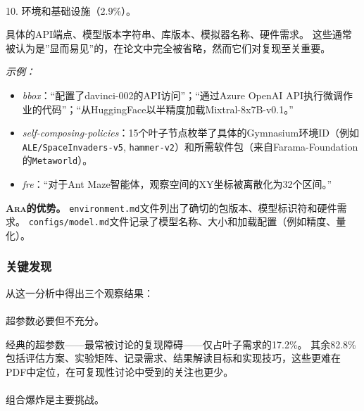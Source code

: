 \documentclass[
]{article}
\makeatletter
\let\oldparagraph\paragraph
\renewcommand{\paragraph}{
    \@ifstar
      \xxxParagraphStar
      \xxxParagraphNoStar
  }
\newcommand{\xxxParagraphStar}[1]{\oldparagraph*{#1}\mbox{}}
\newcommand{\xxxParagraphNoStar}[1]{\oldparagraph{#1}\mbox{}}
\newcommand{\passthrough}[1]{#1}
\providecommand{\tightlist}{%
  \setlength{\itemsep}{0pt}\setlength{\parskip}{0pt}}
\theoremstyle{definition}
\newcommand{\ara}{\textsc{Ara}}
\makeatother
\begin{document}
\paragraph{10.
环境和基础设施（2.9\%）。}\label{ux73afux5883ux548cux57faux7840ux8bbeux65bd2.9}

具体的API端点、模型版本字符串、库版本、模拟器名称、硬件需求。
这些通常被认为是''显而易见''的，在论文中完全被省略，然而它们对复现至关重要。

\emph{示例：}

\begin{itemize}
\tightlist
\item
  \emph{bbox}：``配置了davinci-002的API访问''；``通过Azure OpenAI
  API执行微调作业的代码''；``从HuggingFace以半精度加载Mixtral-8x7B-v0.1。''
\item
  \emph{self-composing-policies}：15个叶子节点枚举了具体的Gymnasium环境ID（例如\passthrough{\lstinline!ALE/SpaceInvaders-v5!},
  \passthrough{\lstinline!hammer-v2!}）和所需软件包（来自Farama-Foundation的\passthrough{\lstinline!Metaworld!}）。
\item
  \emph{fre}：``对于Ant
  Maze智能体，观察空间的XY坐标被离散化为32个区间。''
\end{itemize}

\textbf{\ara{}的优势。}
\passthrough{\lstinline!environment.md!}文件列出了确切的包版本、模型标识符和硬件需求。
\passthrough{\lstinline!configs/model.md!}文件记录了模型名称、大小和加载配置（例如精度、量化）。

\subsubsection{关键发现}\label{ux5173ux952eux53d1ux73b0}

从这一分析中得出三个观察结果：

\paragraph{超参数必要但不充分。}\label{ux8d85ux53c2ux6570ux5fc5ux8981ux4f46ux4e0dux5145ux5206}

经典的超参数------最常被讨论的复现障碍------仅占叶子需求的17.2\%。
其余82.8\%包括评估方案、实验矩阵、记录需求、结果解读目标和实现技巧，这些更难在PDF中定位，在可复现性讨论中受到的关注也更少。

\paragraph{组合爆炸是主要挑战。}\label{ux7ec4ux5408ux7206ux70b8ux662fux4e3bux8981ux6311ux6218}
\end{document}
